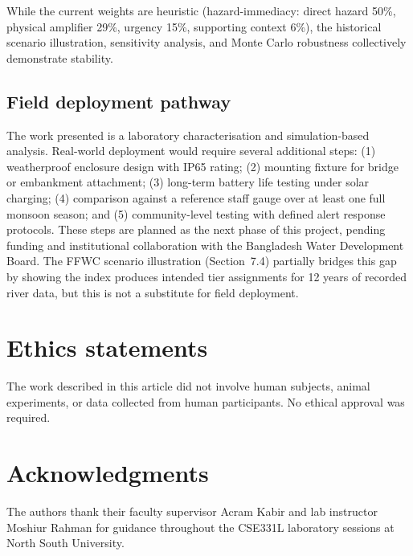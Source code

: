 \documentclass[5p,twocolumn]{elsarticle}
\begin{document}
While the current weights are heuristic (hazard-immediacy: direct hazard 50\%, physical amplifier 29\%, urgency 15\%, supporting context 6\%), the historical scenario illustration, sensitivity analysis, and Monte Carlo robustness collectively demonstrate stability.

\subsection{Field deployment pathway}
\label{sec:deployment}

The work presented is a laboratory characterisation and simulation-based analysis. Real-world deployment would require several additional steps: (1) weatherproof enclosure design with IP65 rating; (2) mounting fixture for bridge or embankment attachment; (3) long-term battery life testing under solar charging; (4) comparison against a reference staff gauge over at least one full monsoon season; and (5) community-level testing with defined alert response protocols. These steps are planned as the next phase of this project, pending funding and institutional collaboration with the Bangladesh Water Development Board. The FFWC scenario illustration (Section~7.4) partially bridges this gap by showing the index produces intended tier assignments for 12 years of recorded river data, but this is not a substitute for field deployment.


\section*{Ethics statements}

The work described in this article did not involve human subjects, animal experiments, or data collected from human participants. No ethical approval was required.

\section*{Acknowledgments}

The authors thank their faculty supervisor Acram Kabir and lab instructor Moshiur Rahman for guidance throughout the CSE331L laboratory sessions at North South University.
\end{document}
